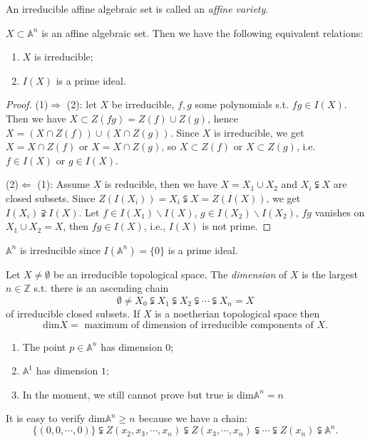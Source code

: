\begin{definition}
	An irreducible affine algebraic set is called an \textit{affine variety}.
\end{definition}
\begin{proposition}\label{5}
	$ X\subset \mathbb{A}^n $ is an affine algebraic set. Then we have the following equivalent relations:
	\begin{enumerate}
		\item $ X $ is irreducible;
		\item $ I(X) $ is a prime ideal.
	\end{enumerate}
\end{proposition}
\begin{proof}
	(1)$ \Rightarrow $ (2): let $ X $ be irreducible, $ f,g $ some polynomials s.t. $ fg\in I(X) $. Then we have $ X\subset Z(fg)=Z(f)\cup Z(g) $, hence $ X=(X\cap Z(f))\cup (X\cap Z(g)) $. Since $ X $ is irreducible, we get $ X=X\cap Z(f) $ or $ X=X\cap Z(g) $, so $ X\subset Z(f) $ or $ X\subset Z(g) $, i.e. $ f\in I(X) $ or $ g\in I(X) $.

	(2)$ \Leftarrow $ (1): Assume $ X $ is reducible, then we have $ X=X_1\cup X_2 $ and $ X_i\subsetneqq X $ are closed subsets.
	Since $ Z(I(X_i))=X_i\subsetneqq X=Z(I(X)) $, we get $ I(X_i)\supsetneqq I(X) $. Let $ f\in I(X_1)\backslash I(X) $, $ g\in I(X_2)\backslash I(X_2) $, $ fg $ vanishes on $ X_1\cup X_2=X $, then $ fg\in I(X) $, i.e., $ I(X) $ is not prime.
\end{proof}
\begin{example}
	$ \mathbb{A}^n $ is irreducible since $ I(\mathbb{A}^n) = \{ 0\} $ is a prime ideal.
\end{example}
\begin{definition}
	Let $ X\neq \emptyset $ be an irreducible topological space. The \textit{dimension} of $ X $ is the largest $ n\in\mathbb{Z} $ s.t. there is an ascending chain
	$$
		\emptyset \neq X_0\subsetneqq X_1\subsetneqq X_2\subsetneqq \cdots\subsetneqq X_n=X
	$$
	of irreducible closed subsets. If $ X $ is a noetherian topological space then
	$$
		\mathrm{dim}X=\text{ maximum of dimension of irreducible components of } X.
	$$
\end{definition}
\begin{remark}
	\begin{enumerate}
		\item The point $ p\in\mathbb{A}^n $ has dimension $ 0 $;
		\item $ \mathbb{A}^1 $ has dimension $ 1 $;
		\item In the moment, we still cannot prove but true is $ \mathrm{dim}\mathbb{A}^n=n $
	\end{enumerate}
	It is easy to verify $ \mathrm{dim}\mathbb{A}^n\geq n $ because we have a chain:
	$$
		\{(0,0,\cdots,0)\}\subsetneqq Z(x_2,x_3,\cdots,x_n)\subsetneqq Z(x_3,\cdots,x_n)\subsetneqq\cdots\subsetneqq Z(x_n)\subsetneqq \mathbb{A}^n.
	$$
\end{remark}
